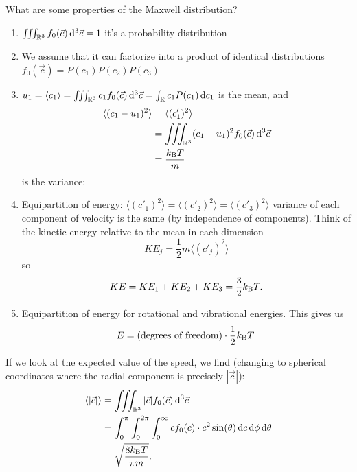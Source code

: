 \begin{node}
What are some properties of the Maxwell distribution?
\begin{enumerate}
\item $\iiint_{\mathbb{R}^{3}}f_{0}(\vec{c})\,\mathrm{d}^{3}\vec{c}=1$ it's a
  probability distribution
\item We assume that it can factorize into a product of identical
  distributions $f_{0}(\vec{c})=P(c_{1})P(c_{2})P(c_{3})$
\item $u_{1}=\langle c_{1}\rangle=\iiint_{\mathbb{R}^{3}}c_{1}f_{0}(\vec{c})\,\mathrm{d}^{3}\vec{c}=\int_{\mathbb{R}}c_{1}P(c_{1})\,\mathrm{d}{c_{1}}$
  is the mean, and
  \begin{subequations}
    \begin{align}
\langle(c_{1}-u_{1})^{2}\rangle
&=\langle(c'_{1})^{2}\rangle\\
&=\iiint_{\mathbb{R}^{3}}(c_{1}-u_{1})^{2}f_{0}(\vec{c})\,\mathrm{d}^{3}\vec{c}\\
&=\frac{k_{\textup{B}} T}{m}
    \end{align}
  \end{subequations}
  is the variance;
\item Equipartition of energy: $\langle(c'_{1})^{2}\rangle=\langle(c'_{2})^{2}\rangle=\langle(c'_{3})^{2}\rangle$
  variance of each component of velocity is the same (by independence
  of components). Think of the kinetic energy relative to the mean in
  each dimension
  \begin{equation}
KE_{j}=\frac{1}{2}m\langle(c'_{j})^{2}\rangle
  \end{equation}
  so
  \begin{equation}
KE = KE_{1}+KE_{2}+KE_{3}=\frac{3}{2}k_{\textup{B}} T.
  \end{equation}
\item Equipartition of energy for rotational and vibrational
  energies. This gives us
  \begin{equation}
E = (\mbox{degrees of freedom})\cdot\frac{1}{2}k_{\textup{B}} T.
  \end{equation}
\end{enumerate}
\end{node}

\begin{node}
If we look at the expected value of the speed, we find (changing to
spherical coordinates where the radial component is precisely $|\vec{c}|$):
\begin{subequations}
  \begin{align}
\langle|\vec{c}|\rangle
&=\iiint_{\mathbb{R}^{3}}|\vec{c}|f_{0}(\vec{c})\,\mathrm{d}^{3}\vec{c}\\
&=\int^{\pi}_{0}\int^{2\pi}_{0}\int^{\infty}_{0}cf_{0}(\vec{c})\cdot
c^{2}\sin(\theta)\,\mathrm{d} c\,\mathrm{d}\phi\,\mathrm{d}\theta\\
&=\sqrt{\frac{8k_{\textup{B}} T}{\pi m}}.
  \end{align}
\end{subequations}
\end{node}

